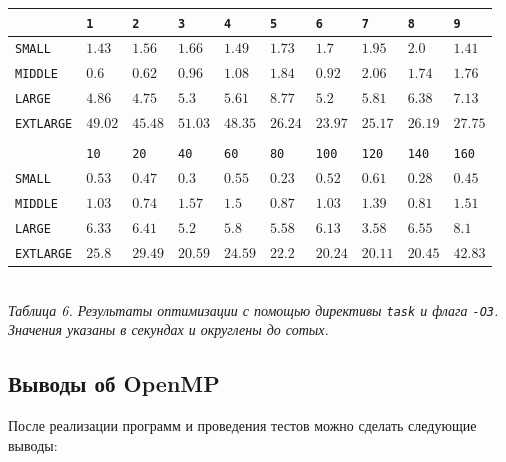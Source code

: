 \documentclass[a4paper, 11pt]{article}
\begin{document}
\begin{center}
    \begin{tabular}{l | l l l l l l l l l}
        & \texttt{1} & \texttt{2} & \texttt{3} & \texttt{4} & \texttt{5} & \texttt{6} & \texttt{7} & \texttt{8} & \texttt{9} \\
        \hline
        \texttt{SMALL}    & $1.43$ & $1.56$ & $1.66$ & $1.49$ & $1.73$ & $1.7$ & $1.95$ & $2.0$ & $1.41$ \\
        \texttt{MIDDLE}   & $0.6$  & $0.62$ & $0.96$ & $1.08$ & $1.84$ & $0.92$ & $2.06$ & $1.74$ & $1.76$ \\
        \texttt{LARGE}    & $4.86$ & $4.75$ & $5.3$  & $5.61$ & $8.77$ & $5.2$ & $5.81$ & $6.38$ & $7.13$ \\
        \texttt{EXTLARGE} & $49.02$ & $45.48$ & $51.03$ & $48.35$ & $26.24$ & $23.97$ & $25.17$ & $26.19$ & $27.75$ \\
        \vspace{0.4cm}\\
        & \texttt{10} & \texttt{20} & \texttt{40} & \texttt{60} & \texttt{80} & \texttt{100} & \texttt{120} & \texttt{140} & \texttt{160} \\
        \hline
        \texttt{SMALL}    & $0.53$ & $0.47$ & $0.3$  & $0.55$ & $0.23$ & $0.52$ & $0.61$ & $0.28$ & $0.45$ \\
        \texttt{MIDDLE}   & $1.03$ & $0.74$ & $1.57$ & $1.5$  & $0.87$ & $1.03$ & $1.39$ & $0.81$ & $1.51$ \\
        \texttt{LARGE}    & $6.33$ & $6.41$ & $5.2$  & $5.8$  & $5.58$ & $6.13$ & $3.58$ & $6.55$ & $8.1$  \\
        \texttt{EXTLARGE} & $25.8$ & $29.49$ & $20.59$ & $24.59$ & $22.2$ & $20.24$ & $20.11$ & $20.45$ & $42.83$ \\
    \end{tabular}\\
    \vspace{0.3cm}
    \small \it
    Таблица 6. Результаты оптимизации с помощью директивы \texttt{task} и флага \texttt{-O3}. Значения указаны в секундах и округлены до сотых.
\end{center}
\newpage

\subsection*{Выводы об OpenMP}
После реализации программ и проведения тестов можно сделать следующие выводы:
\end{document}
